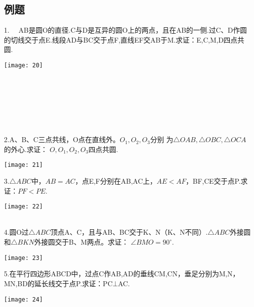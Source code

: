 \subsection{例题}
1.$\quad$ AB是圆O的直径.C与D是互异的圆O上的两点，且在AB的一侧.过C、D作圆的切线交于点E.线段AD与BC交于点F,直线EF交AB于M.求证：E,C,M,D四点共圆.
\begin{center}
    \texttt{[image: 20]}
\end{center}

~\\
~\\
~\\
~\\
~\\
~\\

2.A、B、C三点共线，O点在直线外。$O_1,O_2,O_3$分别
为$\bigtriangleup OAB,\bigtriangleup OBC,\bigtriangleup OCA$的外心.求证： 
$O,O_1,O_2,O_3$四点共圆.
\begin{center}
    \texttt{[image: 21]}
\end{center}
\newpage

3.$\bigtriangleup ABC$中，$AB=AC$，点E,F分别在AB,AC上，$AE<AF$，BF,CE交于点P.求证：$PF<PE$.
\begin{center}
    \texttt{[image: 22]}
\end{center}

~\\

4.圆O过$\bigtriangleup ABC$顶点A、C，且与AB、BC交于K、N（K、N不同）.$\bigtriangleup ABC$外接圆和$\bigtriangleup BKN$外接圆交于B、M两点。求证：
$\angle{BMO}=90^{\circ}$.
\begin{center}
    \texttt{[image: 23]}
\end{center}


5.在平行四边形ABCD中，过点C作AB,AD的垂线CM,CN，垂足分别为M,N，MN,BD的延长线交于点P.求证：PC$\bot $AC.
\begin{center}
    \texttt{[image: 24]}
\end{center}

